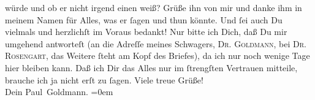 \begin{ledgroupsized}[t]{13cm}
               würde und ob er nicht irgend einen \label{K-L03243-3v}\label{K-L03243-3h} weiß? Grüße ihn von mir und danke ihm in meinem Namen für Alles, was er ſagen
               und thun könnte. Und ſei auch Du vielmals und {\pb}herzlichſt im Voraus bedankt! Nur bitte ich Dich, daß Du mir umgehend antworteſt
               (an die Adreſſe meines Schwagers, \textsc{Dr. Goldmann}, bei \textsc{Dr. }{ }\textsc{Rosengart}, das Weitere ſteht am Kopf des Briefes), da ich nur noch wenige Tage hier bleiben kann.\pend
           \pstart
           Daß ich Dir das Alles nur im ſtrengſten Vertrauen mitteile, brauche ich ja nicht erſt
               zu ſagen.\pend
           \pstart
           Viele treue Grüße! {\\[\baselineskip]}Dein \spacefill\mbox{Paul Goldmann.}\pend
           \leftskip=0em{}
         
         \endnumbering{}\end{ledgroupsized}  \newcommand{\dateiname}{L03243}\newcommand{\titel}{Paul Goldmann an Arthur Schnitzler, 16. 4. [1906]}\newcommand{\editorInnen}{Martin Anton Müller und Laura Untner}
      